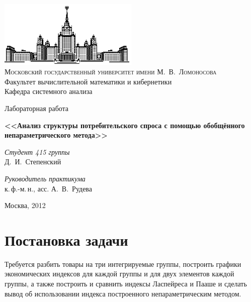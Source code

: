\documentclass[10pt, a4paper]{article}
\begin{document}
\thispagestyle{empty}

\begin{center}
\ \vspace{-3cm}

\includegraphics[width=0.5\textwidth]{msu.eps}\\
{\scshape Московский государственный университет имени М.~В.~Ломоносова}\\
Факультет вычислительной математики и кибернетики\\
Кафедра системного анализа



\vfill
{\LARGE Лабораторная работа}

\vspace{1cm}

{\huge\bfseries <<Анализ структуры потребительского спроса с помощью обобщённого непараметрического метода>>}
\end{center}

\vspace{2cm}

\begin{flushright}
  \large
  \textit{Студент 415 группы}\\
  Д.~И.~Степенский

  \vspace{5mm}

  \textit{Руководитель практикума}\\
  к.\,ф.-м.\,н., асс. А.~В.~Рудева
\end{flushright}

\vfill

\begin{center}
Москва, 2012
\end{center}

\newpage

\tableofcontents

\newpage

\section{Постановка задачи}
Требуется разбить товары на три интегрируемые группы, построить графики экономических индексов для каждой группы и для двух элементов каждой группы, а также построить и сравнить индексы Ласпейреса и Пааше и сделать вывод об использовании индекса построенного непараметрическим методом.
\end{document}
